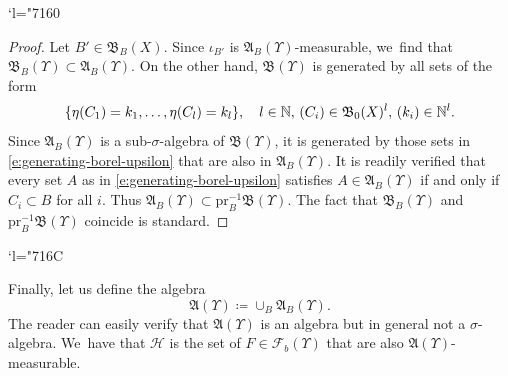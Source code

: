 \documentclass[10pt]{amsart}
\newcommand{\Changel}{\mathcode`l="7160}
\newcommand{\Changelback}{\mathcode`l="716C}
\theoremstyle{definition}
\theoremstyle{remark}
\DeclarePairedDelimiter{\set}{\lbrace}{\rbrace}
\begin{document}
\Changel
\begin{proof}
Let $B' \in \mathfrak{B}_{B}(X)$.
Since $\iota_{B'}$ is $\mathfrak{A}_{B}(\varUpsilon)$-measurable, we~find that $\mathfrak{B}_{B}(\varUpsilon) \subset \mathfrak{A}_{B}(\varUpsilon)$.
On the other hand, $\mathfrak{B}(\varUpsilon)$ is generated by all sets of the form
\begin{equation}\label{e:generating-borel-upsilon}
\set{ \eta(C_{1}) = k_{1}, \dotsc, \eta(C_{l}) = k_{l} }, \quad l \in \mathbb{N},\, (C_{i}) \in \mathfrak{B}_{0}(X)^{l},\, (k_{i}) \in \mathbb{N}^{l}.
\end{equation}
Since $\mathfrak{A}_{B}(\varUpsilon)$ is a sub-$\sigma$-algebra of $\mathfrak{B}(\varUpsilon)$, it is generated by those sets in \cref{e:generating-borel-upsilon} that are also in $\mathfrak{A}_{B}(\varUpsilon)$.
It is readily verified that every set $A$ as in \cref{e:generating-borel-upsilon} satisfies $A \in \mathfrak{A}_{B}(\varUpsilon)$ if and only if $C_{i} \subset B$ for all $i$.
Thus $\mathfrak{A}_{B}(\varUpsilon) \subset \mathrm{pr}_{B}^{-1} \mathfrak{B}(\varUpsilon)$.
The fact that $\mathfrak{B}_{B}(\varUpsilon)$ and $\mathrm{pr}_{B}^{-1} \mathfrak{B}(\varUpsilon)$ coincide is standard.
\end{proof}
\Changelback

Finally, let us define the algebra
\begin{equation*}
\mathfrak{A}(\varUpsilon) \coloneq \cup_{B} \mathfrak{A}_{B}(\varUpsilon).
\end{equation*}
The reader can easily verify that $\mathfrak{A}(\varUpsilon)$ is an algebra but in general not a $\sigma$-algebra. We~have that $\mathscr{H}$ is the set of $F \in \mathscr{F}_{b}(\varUpsilon)$ that are also $\mathfrak{A}(\varUpsilon)$-measurable.
\end{document}
